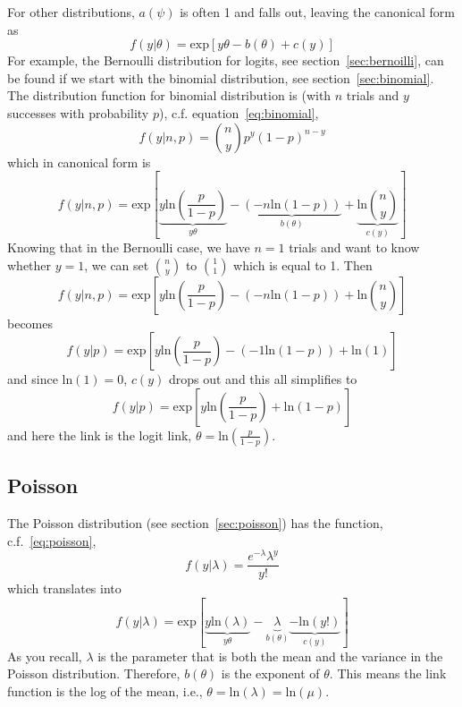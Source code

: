 For other distributions, $a\left(\psi\right)$ is often 1 and falls out, leaving the canonical form as
\begin{equation}
f\left(y|\theta\right) = \mbox{exp}\left[y\theta-b\left(\theta\right)+c\left(y\right)\right]
\end{equation}
For example, the Bernoulli distribution for logits, see section~\ref{sec:bernoilli}, can be found if we start with the binomial distribution, see section~\ref{sec:binomial}. The distribution function for binomial distribution is (with $n$ trials and $y$ successes with probability $p$), c.f. equation~\ref{eq:binomial},
\begin{equation}
f(y|n,p) = {n \choose y}p^y(1-p)^{n-y}
\end{equation}
which in canonical form is
\begin{equation}
f(y|n,p) = \mbox{exp}\left[\underbrace{y\mbox{ln}\left(\frac{p}{1-p}\right)}_{y\theta}-\underbrace{\left(-n\mbox{ln}\left(1-p\right)\right)}_{b\left(\theta\right)}+\underbrace{\mbox{ln}{n \choose y}}_{c\left(y\right)}\right]
\end{equation}
Knowing that in the Bernoulli case, we have $n=1$ trials and want to know whether $y=1$, we can set ${n \choose y}$ to ${1 \choose 1}$ which is equal to 1.  Then
\[
f(y|n,p) = \mbox{exp}\left[y\mbox{ln}\left(\frac{p}{1-p}\right)-\left(-n\mbox{ln}\left(1-p\right)\right)+\mbox{ln}{n \choose y}\right]
\]
becomes
\[
f(y|p) = \mbox{exp}\left[y\mbox{ln}\left(\frac{p}{1-p}\right)-\left(-1\mbox{ln}\left(1-p\right)\right)+\mbox{ln}\left(1\right)\right]
\]
and since $\mbox{ln}\left(1\right) = 0$, $c(y)$ drops out and this all simplifies to
\[
f(y|p) = \mbox{exp}\left[y\mbox{ln}\left(\frac{p}{1-p}\right)+\mbox{ln}\left(1-p\right)\right]
\]
and here the link is the logit link, $\theta = \mbox{ln}\left(\frac{p}{1-p}\right)$.

\subsection{Poisson}

The Poisson distribution (see section~\ref{sec:poisson}) has the function, c.f.~\ref{eq:poisson},
\begin{equation}
f(y|\lambda)=\frac{e^{-\lambda}\lambda^y}{y!}
\end{equation}
which translates into
\begin{equation}
f(y|\lambda)=\mbox{exp}\left[\underbrace{y\mbox{ln}\left(\lambda\right)}_{y\theta}-\underbrace{\lambda}_{b\left(\theta\right)}\underbrace{-\mbox{ln}\left(y!\right)}_{c\left(y\right)}\right]
\end{equation}
As you recall, $\lambda$ is the parameter that is both the mean and the variance in the Poisson distribution. Therefore, $b(\theta)$ is the exponent of $\theta$. This means the link function is the log of the mean, i.e., $\theta = \mbox{ln}(\lambda) = \mbox{ln}(\mu)$.

